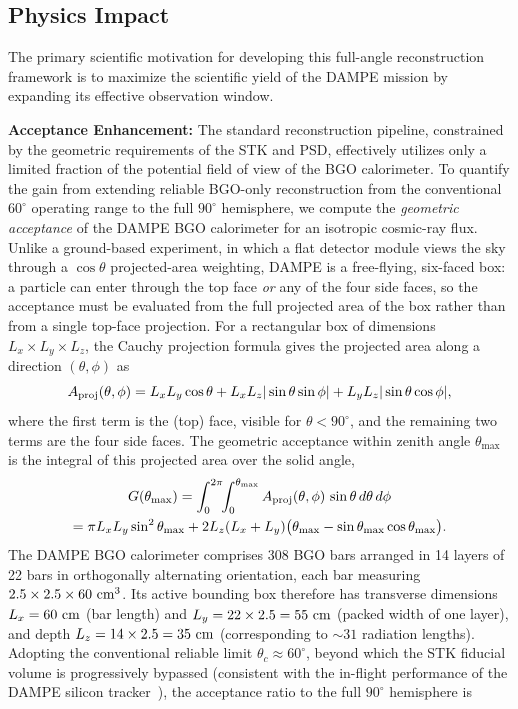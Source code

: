 \documentclass[preprint,12pt]{elsarticle}
\begin{document}
\subsection{Physics Impact}

The primary scientific motivation for developing this full-angle reconstruction framework is to maximize the scientific yield of the DAMPE mission by expanding its effective observation window.

\textbf{Acceptance Enhancement:} The standard reconstruction pipeline, constrained by the geometric requirements of the STK and PSD, effectively utilizes only a limited fraction of the potential field of view of the BGO calorimeter. To quantify the gain from extending reliable BGO-only reconstruction from the conventional $60^{\circ}$ operating range to the full $90^{\circ}$ hemisphere, we compute the \emph{geometric acceptance} of the DAMPE BGO calorimeter for an isotropic cosmic-ray flux. Unlike a ground-based experiment, in which a flat detector module views the sky through a $\cos\theta$ projected-area weighting, DAMPE is a free-flying, six-faced box: a particle can enter through the top face \emph{or} any of the four side faces, so the acceptance must be evaluated from the full projected area of the box rather than from a single top-face projection. For a rectangular box of dimensions $L_x\times L_y\times L_z$, the Cauchy projection formula gives the projected area along a direction $(\theta,\phi)$ as
\begin{equation}
A_{\rm proj}(\theta,\phi)=L_xL_y\cos\theta+L_xL_z|\sin\theta\sin\phi|+L_yL_z|\sin\theta\cos\phi|,
\label{eq:proj}
\end{equation}
where the first term is the (top) face, visible for $\theta<90^{\circ}$, and the remaining two terms are the four side faces. The geometric acceptance within zenith angle $\theta_{\max}$ is the integral of this projected area over the solid angle,
\begin{multline}
G(\theta_{\max})=\int_{0}^{2\pi}\!\!\int_{0}^{\theta_{\max}}A_{\rm proj}(\theta,\phi)\,\sin\theta\,d\theta\,d\phi \\
=\pi L_xL_y\sin^{2}\theta_{\max}+2L_z(L_x+L_y)\bigl(\theta_{\max}-\sin\theta_{\max}\cos\theta_{\max}\bigr).
\label{eq:gf}
\end{multline}
The DAMPE BGO calorimeter comprises 308 BGO bars arranged in 14 layers of 22 bars in orthogonally alternating orientation, each bar measuring $2.5\times2.5\times60\ {\rm cm}^{3}$. Its active bounding box therefore has transverse dimensions $L_x=60\ {\rm cm}$ (bar length) and $L_y=22\times2.5=55\ {\rm cm}$ (packed width of one layer), and depth $L_z=14\times2.5=35\ {\rm cm}$ (corresponding to $\sim31$ radiation lengths). Adopting the conventional reliable limit $\theta_{c}\approx60^{\circ}$, beyond which the STK fiducial volume is progressively bypassed (consistent with the in-flight performance of the DAMPE silicon tracker~\cite{dampe_stk_perf}), the acceptance ratio to the full $90^{\circ}$ hemisphere is
\end{document}
